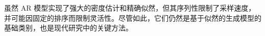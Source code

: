 

虽然 AR 模型实现了强大的密度估计和精确似然，但其序列性限制了采样速度，并可能因固定的排序而限制灵活性。尽管如此，它们仍然是基于似然的生成模型的基础类别，也是现代研究中的关键方法。








